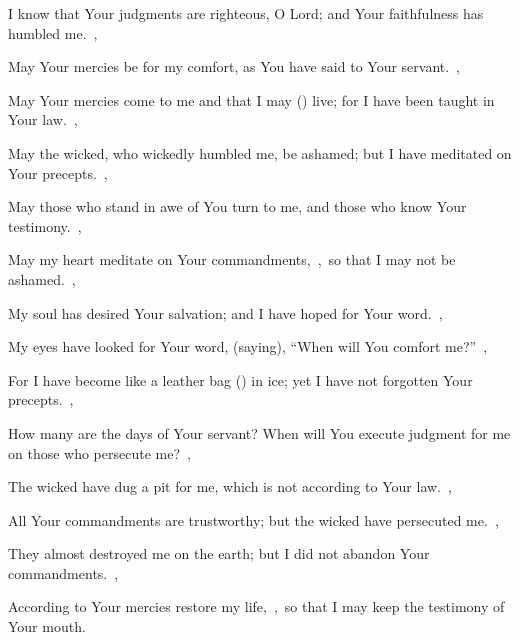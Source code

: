 \documentclass[12pt,twoside,a5paper]{article}
\begin{document}
\begin{normalparskip}
  I know that Your judgments are righteous, O Lord; and Your faithfulness has humbled me.~\sep

  May Your mercies be for my comfort, as You have said to Your servant.~\sep

  May Your mercies come to me and that I may () live; for I have been taught in Your law.~\sep

  May the wicked, who wickedly humbled me, be ashamed; but I have meditated on Your precepts.~\sep

  May those who stand in awe of You turn to me, and those who know Your testimony.~\sep

  May my heart meditate on Your commandments,~\sep\ so that I may not be ashamed.~\sep

   My soul has desired Your salvation; and I have hoped for Your word.~\sep


  My eyes have looked for Your word, (saying), ``When will You comfort me?''~\sep

  For I have become like a leather bag () in ice; yet I have not forgotten Your precepts.~\sep

  How many are the days of Your servant? When will You execute judgment for me on those who persecute me?~\sep

  The wicked have dug a pit for me, which is not according to Your law.~\sep

  All Your commandments are trustworthy; but the wicked have persecuted me.~\sep

  They almost destroyed me on the earth; but I did not abandon Your commandments.~\sep

  According to Your mercies restore my life,~\sep\ so that I may keep the testimony of Your mouth.
\end{normalparskip}




\end{document}
